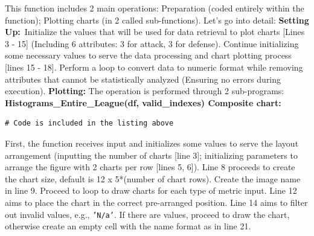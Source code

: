 \documentclass[12pt]{report}
\begin{document}
{{\begin{lstlisting}
\end{lstlisting}
This function includes 2 main operations: Preparation (coded entirely within the function); Plotting charts (in 2 called sub-functions). Let's go into detail:
\textbf{Setting Up:}\
Initialize the values that will be used for data retrieval to plot charts [Lines 3 - 15] (Including 6 attributes: 3 for attack, 3 for defense). Continue initializing some necessary values to serve the data processing and chart plotting process [lines 15 - 18]. Perform a loop to convert data to numeric format while removing attributes that cannot be statistically analyzed (Ensuring no errors during execution).
\textbf{Plotting:} The operation is performed through 2 sub-programs:
\textbf* {Histograms\_Entire\_League(df, valid\_indexes) Composite chart: } %
\begin{lstlisting}
# Code is included in the listing above
\end{lstlisting}
First, the function receives input and initializes some values to serve the layout arrangement (inputting the number of charts [line 3]; initializing parameters to arrange the figure with 2 charts per row [lines 5, 6]). Line 8 proceeds to create the chart size, default is 12 x 5*(number of chart rows). Create the image name in line 9. Proceed to loop to draw charts for each type of metric input. Line 12 aims to place the chart in the correct pre-arranged position. Line 14 aims to filter out invalid values, e.g., \texttt{'N/a'}. If there are values, proceed to draw the chart, otherwise create an empty cell with the name format as in line 21.

}}
\end{document}
